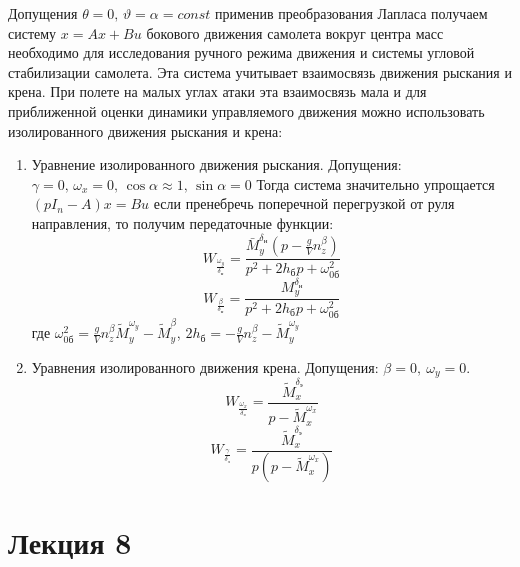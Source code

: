 \documentclass{article}
\begin{document}
Допущения $\theta = 0, \, \vartheta = \alpha = const$ применив преобразования
Лапласа получаем
систему $x = Ax + Bu$ бокового движения самолета вокруг центра масс необходимо
для исследования ручного режима движения и системы угловой стабилизации
самолета. Эта система учитывает взаимосвязь движения рыскания и крена. При
полете на малых углах атаки эта взаимосвязь мала и для приближенной оценки
динамики управляемого движения можно использовать изолированного движения
рыскания и крена:
\begin{enumerate}
    \item Уравнение изолированного движения рыскания. Допущения: $\gamma = 0,
        \, \omega_x = 0, \, \cos{\alpha} \approx 1,\,\sin{\alpha} = 0$
          Тогда система значительно упрощается
          $(pI_n - A)x = B u$
          если пренебречь поперечной перегрузкой от руля направления, то
          получим передаточные функции:
          \[
              W_{\frac{\omega_y}{\delta_\text{н}}}=
              \frac{\bar{M}_y^{\delta_\text{н}} (p - \frac{g}{V}
              n_z^\beta)}{p^2 + 2 h_\text{б}p + \omega^2_{0\text{б}}}
          \]
          \[
              W_{\frac{\beta}{\delta_\text{н}}} =
              \frac{M_y^{\delta_\text{н}}}{p^2 + 2 h_\text{б}p +
              \omega^2_{0\text{б}}}
          \]
          где $\omega_{0\text{б}}^2 = \frac{g}{V} n_z^\beta
          \tilde{M}_y^{\omega_y} - \tilde{M}_y^\beta$, $2h_\text{б} =
          -\frac{g}{V} n_z^\beta - \tilde{M}_y^{\omega_y}$
    \item Уравнения изолированного движения крена. Допущения: $\beta = 0,\
        \omega_y = 0$.
          \[
              W_{\frac{\omega_x}{\delta_\text{э}}} =
              \frac{\tilde{M}_x^{\delta_\text{э}}}{p - \tilde{M}_x^{\omega_x}}
          \]
          \[
              W_{\frac{\gamma}{\delta_\text{э}}} =
              \frac{\tilde{M}_x^{\delta_\text{э}}}{p(p -
              \tilde{M}_x^{\omega_x})}
          \]
\end{enumerate}
\newpage

\section{Лекция 8}
\end{document}
